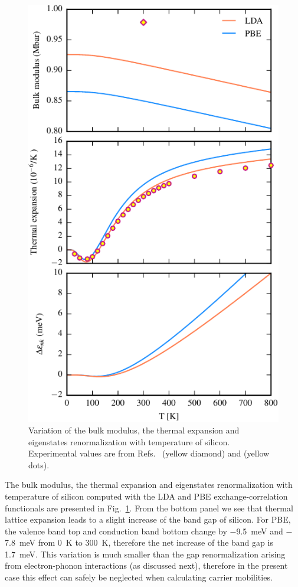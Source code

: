 \documentclass[aps,prl,twocolumn,superscriptaddress]{revtex4-1}
\begin{document}
\begin{figure}
  \centering
  \includegraphics[width=\columnwidth]{figS5.pdf}
  \caption{\label{figS5}
   Variation of the bulk modulus, the thermal expansion and eigenstates renormalization with temperature of silicon.
   Experimental values are from Refs.~ (yellow diamond) and  (yellow dots).
  }
\end{figure}

The bulk modulus, the thermal expansion and eigenstates renormalization with temperature of silicon computed with the LDA and PBE exchange-correlation 
functionals are presented in Fig.~\ref{figS5}. 
From the bottom panel we see that thermal lattice expansion leads to a slight increase of the band gap 
of silicon. 
For PBE, the valence band top and conduction band bottom change by $-$9.5~meV and 
$-$7.8~meV from 0~K to 300~K, therefore the net increase of the band gap is 1.7~meV. This variation
is much smaller than the gap renormalization arising from electron-phonon interactions (as discussed
next), therefore in the present case this effect can safely be neglected when calculating
carrier mobilities.
\end{document}
